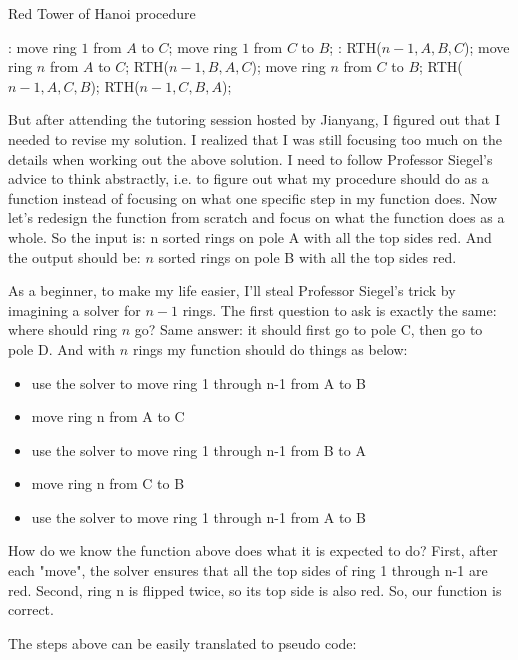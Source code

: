 \documentclass[a4paper,11pt]{article}
\theoremstyle{mytheor}
\begin{document}
\begin{algorithm}[H]
\caption{Red Tower of Hanoi procedure}\label{RTH}
\begin{algorithmic}[1]
  :
    \State move ring $1$ from $A$ to $C$;
    \State move ring $1$ from $C$ to $B$;
  \Else:
    \State RTH($n-1, A, B, C$);
    \State move ring $n$ from $A$ to $C$;
    \State RTH($n-1, B, A, C$);
    \State move ring $n$ from $C$ to $B$;
    \State RTH($n-1, A, C, B$);
    \State RTH($n-1, C, B, A$);
  \EndIf
\EndProcedure
\end{algorithmic}
\end{algorithm}

But after attending the tutoring session hosted by Jianyang, I figured out that I needed to revise my solution. I realized that I was still focusing too much on the details when working out the above solution. I need to follow Professor Siegel's advice to think abstractly, i.e. to figure out what my procedure should do as a function instead of focusing on what one specific step in my function does. Now let's redesign the function from scratch and focus on what the function does as a whole. So the input is: n sorted rings on pole A with all the top sides red. And the output should be: $n$ sorted rings on pole B with all the top sides red.

As a beginner, to make my life easier, I'll steal Professor Siegel's trick by imagining a solver for $n-1$ rings. The first question to ask is exactly the same: where should ring $n$ go? Same answer: it should first go to pole C, then go to pole D. And with $n$ rings my function should do things as below:
\begin{itemize}
    \item use the solver to move ring 1 through n-1 from A to B
    \item move ring n from A to C
    \item use the solver to move ring 1 through n-1 from B to A
    \item move ring n from C to B
    \item use the solver to move ring 1 through n-1 from A to B
\end{itemize}
How do we know the function above does what it is expected to do?
First, after each "move", the solver ensures that all the top sides of ring 1 through n-1 are red. Second, ring n is flipped twice, so its top side is also red. So, our function is correct.

The steps above can be easily translated to pseudo code:
\iffalse
\begin{lstlisting}[label={list:seventh1},caption=Improved Red Tower of Hanoi procedure.]
procedure IRTH(n, A, B, C);
  if n == 1:
    move ring 1 from A to C;
    move ring 1 from C to B;
  else:
    IRTH(n-1, A, B, C);
    move ring n from A to C;
    IRTH(n-1, B, A, C);
    move ring n from C to B;
    IRTH(n-1, A, B, C);
\end{lstlisting}
\fi
\end{document}
